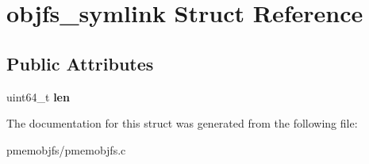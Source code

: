 \hypertarget{structobjfs__symlink}{}\section{objfs\+\_\+symlink Struct Reference}
\label{structobjfs__symlink}
\subsection*{Public Attributes}
\begin{DoxyCompactItemize}
\item 
\mbox{\label{structobjfs__symlink_a61a7d3d577c6ec41510d22970b369ce6}} 
uint64\+\_\+t {\bfseries len}
\end{DoxyCompactItemize}


The documentation for this struct was generated from the following file\+:\begin{DoxyCompactItemize}
\item 
pmemobjfs/pmemobjfs.\+c\end{DoxyCompactItemize}
